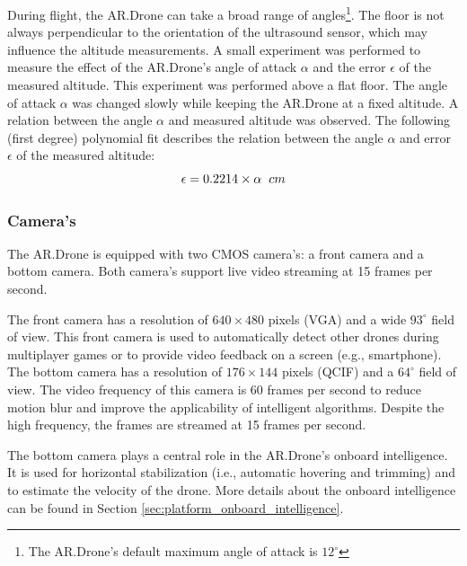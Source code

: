 During flight, the AR.Drone can take a broad range of angles\footnote{The AR.Drone's default maximum angle of attack is $12^{\circ}$}.
The floor is not always perpendicular to the orientation of the ultrasound sensor, which may influence the altitude measurements.
A small experiment was performed to measure the effect of the AR.Drone's angle of attack $\alpha$ and the error $\epsilon$ of the measured altitude.
This experiment was performed above a flat floor.
The angle of attack $\alpha$ was changed slowly while keeping the AR.Drone at a fixed altitude.
A relation between the angle $\alpha$ and measured altitude was observed.
The following (first degree) polynomial fit describes the relation between the angle $\alpha$ and error $\epsilon$ of the measured altitude:
\begin{equation}
\epsilon = 0.2214 \times \alpha \hspace{0.2cm} \begin{small}cm\end{small}
\end{equation}
\normalsize
\normalcolor



\subsubsection{Camera's}
The AR.Drone is equipped with two CMOS camera's: a front camera and a bottom camera.
Both camera's support live video streaming at 15 frames per second.

The front camera has a resolution of $640 \times 480$ pixels (VGA) and a wide $93^{\circ}$ field of view.
This front camera is used to automatically detect other drones during multiplayer games or to provide video feedback on a screen (e.g., smartphone).
The bottom camera has a resolution of $176 \times 144$ pixels (QCIF) and a $64^{\circ}$ field of view.
The video frequency of this camera is 60 frames per second to reduce motion blur and improve the applicability of intelligent algorithms.
Despite the high frequency, the frames are streamed at 15 frames per second.


The bottom camera plays a central role in the AR.Drone's onboard intelligence.
It is used for horizontal stabilization (i.e., automatic hovering and trimming) and to estimate the velocity of the drone.
More details about the onboard intelligence can be found in Section \ref{sec:platform_onboard_intelligence}.



